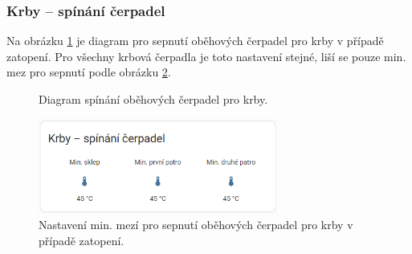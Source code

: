 
\begin{Czech}
\subsubsection{Krby – spínání čerpadel}
\end{Czech}

\begin{Czech}
Na obrázku \ref{fig:diagram-fireplace} je diagram pro sepnutí oběhových čerpadel pro krby v případě zatopení. Pro všechny krbová čerpadla je toto nastavení stejné, liší se pouze min. mez pro sepnutí podle obrázku \ref{fig:fireplace-switching-pumps}.
\end{Czech}

\begin{Czech}
\begin{figure}[H]
    \centering
    \def\svgwidth{1\columnwidth}
    \graphicspath{{pictures/czech/software/svg/}}
    
    \caption[]{Diagram spínání oběhových čerpadel pro krby.}
    \label{fig:diagram-fireplace}
\end{figure}
\end{Czech}

\begin{Czech}
\begin{figure}[H]
    \centering
    \includegraphics[width=0.7\textwidth]{pictures/czech/software/fireplace-switching-pumps.png}
    \caption{Nastavení min. mezí pro sepnutí oběhových čerpadel pro krby v případě zatopení.}
    \label{fig:fireplace-switching-pumps}
\end{figure}
\end{Czech}

\begin{Czech}
\end{Czech}


